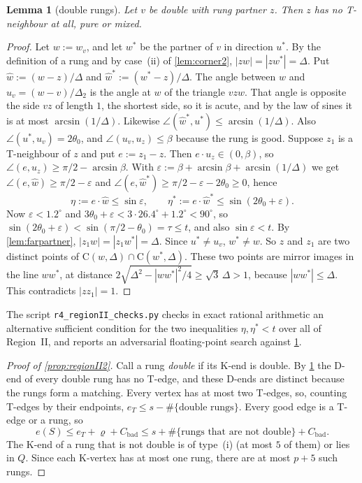 \documentclass[11pt]{amsart}
\newtheorem{lemma}[theorem]{Lemma}
\theoremstyle{definition}
\theoremstyle{remark}
\newcommand{\Dt}{\Delta_2}
\newcommand{\eps}{\varepsilon}
\newcommand{\Cc}{\mathrm{C}}      %
\begin{document}
\begin{lemma}[double rungs]\label{lem:doublerung}
Let $v$ be double with rung partner $z$. Then $z$ has no T-neighbour at all, pure or mixed.
\end{lemma}
\begin{proof}
Let $w:=w_v$, and let $w^*$ be the partner of $v$ in direction $u^*$. By the definition of a rung and by case~(ii) of \cref{lem:corner2}, $|zw|=|zw^*|=\Delta$. Put $\hat w:=(w-z)/\Delta$ and $\hat w^*:=(w^*-z)/\Delta$.
The angle between $\hat w$ and $u_v=(w-v)/\Dt$ is the angle at $w$ of the triangle $vzw$. That angle is opposite the side $vz$ of length $1$, the shortest side, so it is acute, and by the law of sines it is at most $\arcsin(1/\Delta)$. Likewise $\angle(\hat w^*,u^*)\le\arcsin(1/\Delta)$. Also $\angle(u^*,u_v)=2\theta_0$, and $\angle(u_v,u_z)\le\beta$ because the rung is good.
Suppose $z_1$ is a T-neighbour of $z$ and put $e:=z_1-z$. Then $e\cdot u_z\in(0,\beta)$, so $\angle(e,u_z)\ge\pi/2-\arcsin\beta$. With $\eps:=\beta+\arcsin\beta+\arcsin(1/\Delta)$ we get $\angle(e,\hat w)\ge\pi/2-\eps$ and $\angle(e,\hat w^*)\ge\pi/2-\eps-2\theta_0\ge0$, hence
\[
\eta:=e\cdot\hat w\le\sin\eps,\qquad \eta^*:=e\cdot\hat w^*\le\sin(2\theta_0+\eps).
\]
Now $\eps<1.2^\circ$ and $3\theta_0+\eps<3\cdot26.4^\circ+1.2^\circ<90^\circ$, so $\sin(2\theta_0+\eps)<\sin(\pi/2-\theta_0)=\tau\le t$, and also $\sin\eps<t$. By \cref{lem:farpartner}, $|z_1w|=|z_1w^*|=\Delta$. Since $u^*\ne u_v$, $w^*\ne w$. So $z$ and $z_1$ are two distinct points of $\Cc(w,\Delta)\cap\Cc(w^*,\Delta)$. These two points are mirror images in the line $ww^*$, at distance $2\sqrt{\Delta^2-|ww^*|^2/4}\ge\sqrt3\,\Delta>1$, because $|ww^*|\le\Delta$. This contradicts $|zz_1|=1$.
\end{proof}
The script \texttt{r4\_regionII\_checks.py} checks in exact rational arithmetic an alternative sufficient condition for the two inequalities $\eta,\eta^*<t$ over all of Region~II, and reports an adversarial floating-point search against \cref{lem:doublerung}.

\begin{proof}[Proof of \cref{prop:regionII2}]
Call a rung \emph{double} if its K-end is double. By \cref{lem:doublerung} the D-end of every double rung has no T-edge, and these D-ends are distinct because the rungs form a matching. Every vertex has at most two T-edges, so, counting T-edges by their endpoints, $e_T\le s-\#\{\text{double rungs}\}$. Every good edge is a T-edge or a rung, so
\[
e(S)\le e_T+\varrho+C_{\mathrm{bad}}\le s+\#\{\text{rungs that are not double}\}+C_{\mathrm{bad}}.
\]
The K-end of a rung that is not double is of type~(i) (at most $5$ of them) or lies in $Q$. Since each K-vertex has at most one rung, there are at most $p+5$ such rungs.
\end{proof}
\end{document}
